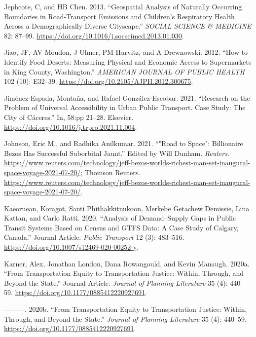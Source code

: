 \documentclass[12pt, oneside]{report}
\newlength{\cslhangindent}
\newlength{\cslentryspacingunit} %
\newenvironment{CSLReferences}[2] %
 {%
  \setlength{\parindent}{0pt}
  \ifodd #1
  \let\oldpar\par
  \def\par{\hangindent=\cslhangindent\oldpar}
  \fi
  \setlength{\parskip}{#2\cslentryspacingunit}
 }%
 {}
\begin{document}
\begin{CSLReferences}{1}{0}
\leavevmode{}%
Jephcote, C, and HB Chen. 2013. {``Geospatial Analysis of Naturally
Occurring Boundaries in Road-Transport Emissions and Children's
Respiratory Health Across a Demographically Diverse Cityscape.''}
\emph{SOCIAL SCIENCE \& MEDICINE} 82: 87--99.
\url{https://doi.org/10.1016/j.socscimed.2013.01.030}.

\leavevmode{}%
Jiao, JF, AV Moudon, J Ulmer, PM Hurvitz, and A Drewnowski. 2012. {``How
to {Identify Food Deserts}: {Measuring Physical} and {Economic Access}
to {Supermarkets} in {King County}, {Washington}.''} \emph{AMERICAN
JOURNAL OF PUBLIC HEALTH} 102 (10): E32--39.
\url{https://doi.org/10.2105/AJPH.2012.300675}.

\leavevmode{}%
Jiménez-Espada, Montaña, and Rafael González-Escobar. 2021. {``Research
on the Problem of Universal Accessibility in Urban Public Transport.
{Case} Study: The City of {Cáceres}.''} In, 58:pp 21--28. {Elsevier}.
\url{https://doi.org/10.1016/j.trpro.2021.11.004}.

\leavevmode{}%
Johnson, Eric M., and Radhika Anilkumar. 2021. {``"Road to Space":
Billionaire Bezos Has Successful Suborbital Jaunt.''} Edited by Will
Dunham. \emph{Reuters}.
\url{https://www.reuters.com/technology/jeff-bezos-worlds-richest-man-set-inaugural-space-voyage-2021-07-20/};
Thomson Reuters.
\url{https://www.reuters.com/technology/jeff-bezos-worlds-richest-man-set-inaugural-space-voyage-2021-07-20/}.

\leavevmode{}%
Kaeoruean, Koragot, Santi Phithakkitnukoon, Merkebe Getachew Demissie,
Lina Kattan, and Carlo Ratti. 2020. {``Analysis of Demand--Supply Gaps
in Public Transit Systems Based on Census and GTFS Data: A Case Study of
Calgary, Canada.''} Journal Article. \emph{Public Transport} 12 (3):
483--516. \url{https://doi.org/10.1007/s12469-020-00252-y}.

\leavevmode{}%
Karner, Alex, Jonathan London, Dana Rowangould, and Kevin Manaugh.
2020a. {``From Transportation Equity to Transportation Justice: Within,
Through, and Beyond the State.''} Journal Article. \emph{Journal of
Planning Literature} 35 (4): 440--59.
\url{https://doi.org/10.1177/0885412220927691}.

\leavevmode{}%
---------. 2020b. {``From {Transportation Equity} to {Transportation
Justice}: {Within}, {Through}, and {Beyond} the {State}.''}
\emph{Journal of Planning Literature} 35 (4): 440--59.
\url{https://doi.org/10.1177/0885412220927691}.


\end{CSLReferences}
\end{document}
